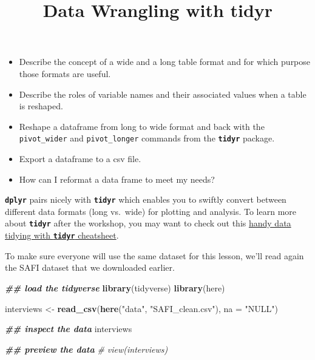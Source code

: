 \documentclass[
]{article}
\title{Data Wrangling with tidyr}
\author{}
\date{\vspace{-2.5em}}
\newenvironment{Shaded}{\begin{snugshade}}{\end{snugshade}}
\newcommand{\AttributeTok}[1]{\textcolor[rgb]{0.13,0.29,0.53}{#1}}
\newcommand{\CommentTok}[1]{\textcolor[rgb]{0.56,0.35,0.01}{\textit{#1}}}
\newcommand{\DocumentationTok}[1]{\textcolor[rgb]{0.56,0.35,0.01}{\textbf{\textit{#1}}}}
\newcommand{\FunctionTok}[1]{\textcolor[rgb]{0.13,0.29,0.53}{\textbf{#1}}}
\newcommand{\NormalTok}[1]{#1}
\newcommand{\OtherTok}[1]{\textcolor[rgb]{0.56,0.35,0.01}{#1}}
\newcommand{\StringTok}[1]{\textcolor[rgb]{0.31,0.60,0.02}{#1}}
\providecommand{\tightlist}{%
  \setlength{\itemsep}{0pt}\setlength{\parskip}{0pt}}
\begin{document}
\maketitle

\begin{itemize}
\tightlist
\item
  Describe the concept of a wide and a long table format and for which
  purpose those formats are useful.
\item
  Describe the roles of variable names and their associated values when
  a table is reshaped.
\item
  Reshape a dataframe from long to wide format and back with the
  \texttt{pivot\_wider} and \texttt{pivot\_longer} commands from the
  \textbf{\texttt{tidyr}} package.
\item
  Export a dataframe to a csv file.
\end{itemize}

\begin{itemize}
\tightlist
\item
  How can I reformat a data frame to meet my needs?
\end{itemize}

\textbf{\texttt{dplyr}} pairs nicely with \textbf{\texttt{tidyr}} which
enables you to swiftly convert between different data formats (long
vs.~wide) for plotting and analysis. To learn more about
\textbf{\texttt{tidyr}} after the workshop, you may want to check out
this
\href{https://raw.githubusercontent.com/rstudio/cheatsheets/main/tidyr.pdf}{handy
data tidying with \textbf{\texttt{tidyr}} cheatsheet}.

To make sure everyone will use the same dataset for this lesson, we'll
read again the SAFI dataset that we downloaded earlier.

\begin{Shaded}
\begin{Highlighting}[]
\DocumentationTok{\#\# load the tidyverse}
\FunctionTok{library}\NormalTok{(tidyverse)}
\FunctionTok{library}\NormalTok{(here)}

\NormalTok{interviews }\OtherTok{\textless{}{-}} \FunctionTok{read\_csv}\NormalTok{(}\FunctionTok{here}\NormalTok{(}\StringTok{"data"}\NormalTok{, }\StringTok{"SAFI\_clean.csv"}\NormalTok{), }\AttributeTok{na =} \StringTok{"NULL"}\NormalTok{)}

\DocumentationTok{\#\# inspect the data}
\NormalTok{interviews}

\DocumentationTok{\#\# preview the data}
\CommentTok{\# view(interviews)}
\end{Highlighting}
\end{Shaded}
\end{document}
